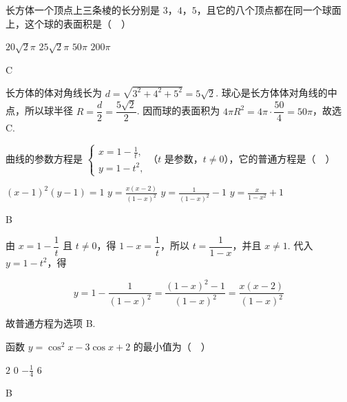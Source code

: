 \begin{problem}
长方体一个顶点上三条棱的长分别是 \(3\)，\(4\)，\(5\)，且它的八个顶点都在同一个球面上，这个球的表面积是（\(\quad\)）

\choices
    {\(20\sqrt{2}\pi\)}
    {\(25\sqrt{2}\pi\)}
    {\(50\pi\)}
    {\(200\pi\)}
\end{problem}

\begin{answer}
C
\end{answer}

\begin{solution}
长方体的体对角线长为 \(d=\sqrt{3^{2}+4^{2}+5^{2}}=5\sqrt{2}\). 球心是长方体体对角线的中点，所以球半径 \(R=\dfrac{d}{2}=\dfrac{5\sqrt{2}}{2}\). 因而球的表面积为 \(4\pi R^{2}=4\pi\cdot\dfrac{50}{4}=50\pi\)，故选 C.
\end{solution}

\begin{problem}
曲线的参数方程是 \(\begin{cases}
x = 1 - \frac{1}{t},\\
y = 1 - t^2,
\end{cases}\)（\(t\) 是参数，\(t \neq 0\)），它的普通方程是（\(\quad\)）

\choices
    {\((x - 1)^{2}(y - 1) = 1\)}
    {\(y = \frac{x(x - 2)}{(1 - x)^2}\)}
    {\(y = \frac{1}{(1 - x)^2} - 1\)}
    {\(y = \frac{x}{1 - x^2} + 1\)}
\end{problem}

\begin{answer}
B
\end{answer}

\begin{solution}
由 \(x=1-\dfrac1t\) 且 \(t\ne0\)，得 \(1-x=\dfrac1t\)，所以 \(t=\dfrac1{1-x}\)，并且 \(x\ne1\). 代入 \(y=1-t^{2}\)，得

\[
y=1-\frac{1}{(1-x)^{2}}=\frac{(1-x)^{2}-1}{(1-x)^{2}}=\frac{x(x-2)}{(1-x)^{2}}
\]

故普通方程为选项 B.
\end{solution}

\begin{problem}
函数 \(y = \cos^2 x - 3\cos x + 2\) 的最小值为（\(\quad\)）

\choices
    {\(2\)}
    {\(0\)}
    {\(-\frac{1}{4}\)}
    {\(6\)}
\end{problem}

\begin{answer}
B
\end{answer}

